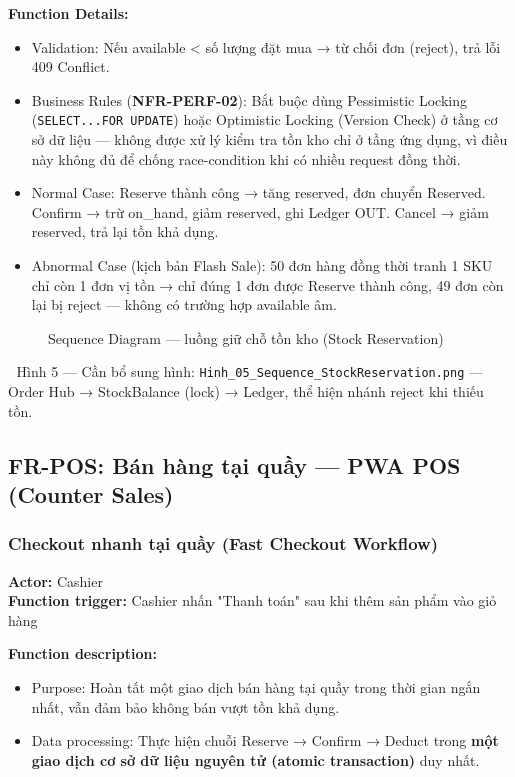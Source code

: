 \textbf{Function Details:}
\begin{itemize}
    \item Validation: Nếu available < số lượng đặt mua → từ chối đơn (reject), trả lỗi 409 Conflict.
    \item Business Rules (\textbf{NFR-PERF-02}): Bắt buộc dùng Pessimistic Locking (\texttt{SELECT...FOR UPDATE}) hoặc Optimistic Locking (Version Check) ở tầng cơ sở dữ liệu — không được xử lý kiểm tra tồn kho chỉ ở tầng ứng dụng, vì điều này không đủ để chống race-condition khi có nhiều request đồng thời.
    \item Normal Case: Reserve thành công → tăng reserved, đơn chuyển Reserved. Confirm → trừ on\_hand, giảm reserved, ghi Ledger OUT. Cancel → giảm reserved, trả lại tồn khả dụng.
    \item Abnormal Case (kịch bản Flash Sale): 50 đơn hàng đồng thời tranh 1 SKU chỉ còn 1 đơn vị tồn → chỉ đúng 1 đơn được Reserve thành công, 49 đơn còn lại bị reject — không có trường hợp available âm.
\end{itemize}

\begin{figure}[H]
    \centering
    \caption{Sequence Diagram — luồng giữ chỗ tồn kho (Stock Reservation)}
    \label{fig:seq-stock-reservation}
\end{figure}
\begin{imgnote}
📌 Hình 5 — Cần bổ sung hình: \texttt{Hinh\_05\_Sequence\_StockReservation.png} — Order Hub → StockBalance (lock) → Ledger, thể hiện nhánh reject khi thiếu tồn.
\end{imgnote}

\subsection{FR-POS: Bán hàng tại quầy — PWA POS (Counter Sales)}

\subsubsection{Checkout nhanh tại quầy (Fast Checkout Workflow)}
\textbf{Actor:} Cashier \\
\textbf{Function trigger:} Cashier nhấn "Thanh toán" sau khi thêm sản phẩm vào giỏ hàng

\textbf{Function description:}
\begin{itemize}
    \item Purpose: Hoàn tất một giao dịch bán hàng tại quầy trong thời gian ngắn nhất, vẫn đảm bảo không bán vượt tồn khả dụng.
    \item Data processing: Thực hiện chuỗi Reserve → Confirm → Deduct trong \textbf{một giao dịch cơ sở dữ liệu nguyên tử (atomic transaction)} duy nhất.
\end{itemize}

